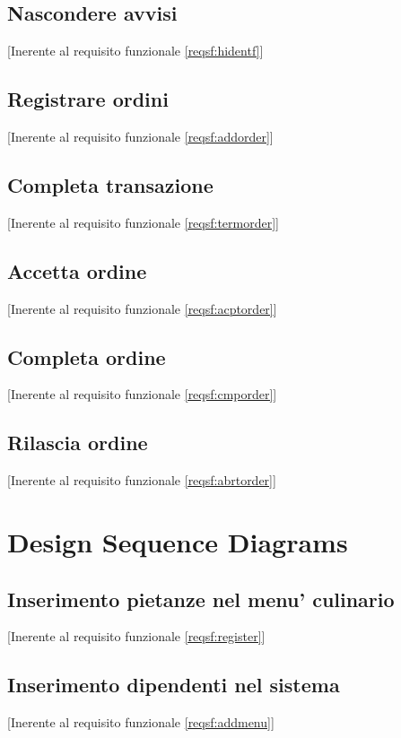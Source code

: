 	\newpage\subsection{Nascondere avvisi}[Inerente al requisito funzionale \ref{reqsf:hidentf}]

	\newpage\subsection{Registrare ordini}[Inerente al requisito funzionale \ref{reqsf:addorder}]

	\newpage\subsection{Completa transazione}[Inerente al requisito funzionale \ref{reqsf:termorder}]

	\newpage\subsection{Accetta ordine}[Inerente al requisito funzionale \ref{reqsf:acptorder}]

	\newpage\subsection{Completa ordine}[Inerente al requisito funzionale \ref{reqsf:cmporder}]

	\newpage\subsection{Rilascia ordine}[Inerente al requisito funzionale \ref{reqsf:abrtorder}]

	\section{Design Sequence Diagrams}
	\subsection{Inserimento pietanze nel menu' culinario}[Inerente al requisito funzionale \ref{reqsf:register}]

	\subsection{Inserimento dipendenti nel sistema}[Inerente al requisito funzionale \ref{reqsf:addmenu}]

